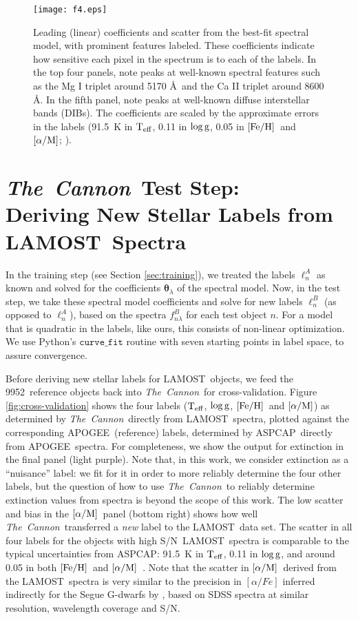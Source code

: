 \documentclass[12pt, letterpaper, preprint]{aastex}
\newcommand{\tc}{\textsl{The~Cannon}}
\newcommand{\apogee}{APOGEE}
\newcommand{\aspcap}{ASPCAP}
\newcommand{\lamost}{LAMOST}
\newcommand{\set}[1]{\bm{#1}}
\newcommand{\teff}{\mbox{$\rm T_{eff}$}}
\newcommand{\feh}{\mbox{$\rm [Fe/H]$}}
\newcommand{\alpham}{\mbox{$\rm [\alpha/M]$}}
\newcommand{\logg}{\mbox{$\rm \log g$}}
\newcommand{\starlabel}{\ell}
\newcommand{\starlabelvec}{\set{\starlabel}}
\newcommand{\angstrom}{\mbox{\AA}}
\newcommand{\ntrobj}{9952}
\newcommand{\snr}{S/N}
\begin{document}
\begin{figure}[!p]
\centering
\texttt{[image: f4.eps]}
\caption{Leading (linear) coefficients and scatter from the best-fit spectral model, with prominent features labeled.
These coefficients indicate how sensitive each pixel in the spectrum is to each of the labels.
In the top four panels, note peaks at well-known spectral features such as the Mg I triplet around 5170 \angstrom\ and the Ca II triplet around 8600 \angstrom. In the fifth panel, 
note peaks at well-known diffuse interstellar bands (DIBs).
The coefficients are scaled by the approximate errors in the labels
(91.5~K in \teff, 0.11 in \logg, 0.05 in \feh\ and \alpham; \citet{Holtzman2015}). 
}
\label{fig:leading-coeffs}
\end{figure}

\section{\tc\ Test Step: \\ Deriving New Stellar Labels from \lamost\ Spectra}
\label{sec:test}

In the training step (see Section \ref{sec:training}), we
treated the labels $\starlabelvec^A_n$ as known and 
solved for the coefficients $\set{\theta}_\lambda$ of the spectral model. 
Now, in the test step, we take these spectral model coefficients
and solve for new labels $\starlabelvec^B_n$ 
(as opposed to $\starlabelvec^A_n$), based on the 
spectra $f_{n\lambda}^B$ for each test object $n$.
For a model that is quadratic in the labels, 
like ours, this consists of non-linear optimization. 
We use Python's $\texttt{curve\_fit}$ routine with seven 
starting points in label space, to assure convergence. 

Before deriving new stellar labels for \lamost\ objects, 
we feed the \ntrobj\ reference objects back into \tc\ for cross-validation.  
Figure \ref{fig:cross-validation} shows the four labels
(\teff, \logg, \feh\, and \alpham) as determined by \tc\ directly
from \lamost\ spectra,
plotted against the corresponding \apogee\ (reference) labels, determined by \aspcap\ directly from \apogee\ spectra. 
For completeness, we show the output for extinction in the 
final panel (light purple).
Note that, in this work, we consider extinction as a ``nuisance''
label: we fit for it in order to more reliably determine
the four other labels, but the question of how to use \tc\ to reliably determine extinction values from spectra is beyond the scope of this work.
The low scatter and bias in the \alpham\ panel (bottom right)
shows how well \tc\ transferred a {\sl new} label
to the \lamost\ data set.
The scatter in all four labels for the objects with high \snr\ \lamost\ spectra is comparable to the typical uncertainties from  ASPCAP:  91.5~K in \teff, 0.11 in 
\logg, and around 0.05 in both \feh\ and \alpham\  \citep{Holtzman2015}. Note that the scatter in \alpham\ derived from the \lamost\ spectra is very similar to the precision in $[\alpha /Fe]$ inferred indirectly for the Segue G-dwarfs by \citet{Bovy2012},
based on SDSS spectra at similar resolution, wavelength coverage and \snr. 
\end{document}
